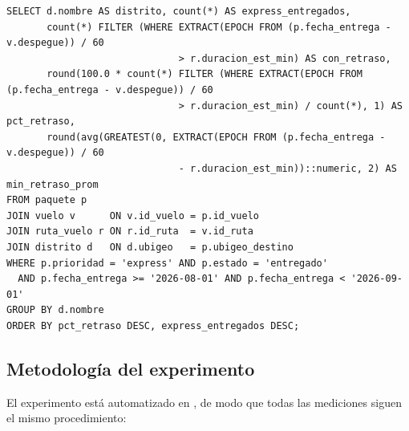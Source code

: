 \begin{lstlisting}[style=sql,title={C5}]
SELECT d.nombre AS distrito, count(*) AS express_entregados,
       count(*) FILTER (WHERE EXTRACT(EPOCH FROM (p.fecha_entrega - v.despegue)) / 60
                              > r.duracion_est_min) AS con_retraso,
       round(100.0 * count(*) FILTER (WHERE EXTRACT(EPOCH FROM (p.fecha_entrega - v.despegue)) / 60
                              > r.duracion_est_min) / count(*), 1) AS pct_retraso,
       round(avg(GREATEST(0, EXTRACT(EPOCH FROM (p.fecha_entrega - v.despegue)) / 60
                              - r.duracion_est_min))::numeric, 2) AS min_retraso_prom
FROM paquete p
JOIN vuelo v      ON v.id_vuelo = p.id_vuelo
JOIN ruta_vuelo r ON r.id_ruta  = v.id_ruta
JOIN distrito d   ON d.ubigeo   = p.ubigeo_destino
WHERE p.prioridad = 'express' AND p.estado = 'entregado'
  AND p.fecha_entrega >= '2026-08-01' AND p.fecha_entrega < '2026-09-01'
GROUP BY d.nombre
ORDER BY pct_retraso DESC, express_entregados DESC;
\end{lstlisting}

\subsection{Metodología del experimento}
\label{sec:metodologia}

El experimento está automatizado en , de modo que todas las mediciones siguen el mismo procedimiento:

